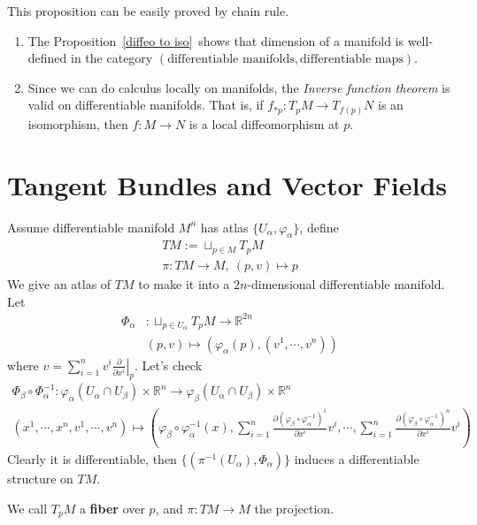 This proposition can be easily proved by chain rule.

\begin{rem}
    \begin{enumerate}[(1)]
        \item The Proposition~\ref{diffeo to iso}~shows that dimension of a manifold is well-defined in the category $(\text{differentiable manifolds},\text{differentiable maps})$.
        \item Since we can do calculus locally on manifolds, the \emph{Inverse function theorem} is valid on differentiable manifolds.
        That is, if $f_{*p}:T_pM\to T_{f(p)}N$ is an isomorphism, then $f:M\to N$ is a local diffeomorphism at $p$.
    \end{enumerate}
\end{rem}

\section{Tangent Bundles and Vector Fields}
\begin{defn}
    Assume differentiable manifold $M^n$ has atlas $\{U_\alpha,\varphi_\alpha\}$, define
    \begin{gather*}
        TM:=\sqcup_{p\in M}T_pM\\
        \pi:TM\to M,\ (p,v)\mapsto p
    \end{gather*}
    We give an atlas of $TM$ to make it into a $2n$-dimensional differentiable manifold.
    Let
    \begin{align*}
        \Phi_\alpha&:\sqcup_{p\in U_\alpha}T_pM\to\mathbb{R}^{2n}\\
        &(p,v)\mapsto(\varphi_\alpha(p),(v^1,\cdots,v^n))
    \end{align*}
    where $v=\sum_{i=1}^nv^i\left.\frac{\partial{}}{\partial{x^i}}\right|_p$.
    Let's check
    \begin{gather*}
        \Phi_\beta\circ\Phi_\alpha^{-1}:\varphi_{\alpha}(U_\alpha\cap U_\beta)\times\mathbb{R}^n\to\varphi_\beta(U_\alpha\cap U_\beta)\times\mathbb{R}^n\\
        (x^1,\cdots,x^n,v^1,\cdots,v^n)\mapsto\left(\varphi_\beta\circ\varphi_\alpha^{-1}(x),\sum_{i=1}^n\frac{\partial(\varphi_\beta\circ\varphi_\alpha^{-1})^1}{\partial{x^i}}v^i,\cdots,\sum_{i=1}^n\frac{\partial(\varphi_\beta\circ\varphi_\alpha^{-1})^n}{\partial{x^i}}v^i\right)
    \end{gather*}
    Clearly it is differentiable, then $\{(\pi^{-1}(U_\alpha),\Phi_\alpha)\}$ induces a differentiable structure on $TM$.

    We call $T_pM$ a \textbf{fiber} over $p$, and $\pi:TM\to M$ the projection.
\end{defn}

